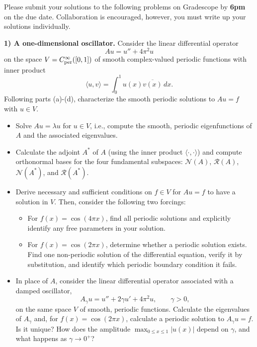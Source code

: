 \documentclass[12pt]{article}
\begin{document}
\noindent
Please submit your solutions to the following problems on Gradescope by \textbf{6pm} on the due date. Collaboration is encouraged, however, you must write up your solutions individually.

\bigskip

\noindent
\textbf{1) A one-dimensional oscillator.}
Consider the linear differential operator
\[
    Au=u''+4\pi^2u
\]
on the space $V=C_{\rm per}^\infty([0,1])$ of smooth complex-valued periodic functions with inner product
\[
    \langle u,v\rangle
    =\int_0^1 u(x)\overline{v(x)}\,dx.
\]
Following parts (a)-(d), characterize the smooth periodic solutions to $Au=f$ with $u\in V$.

\begin{itemize}
    \item[(a)] Solve $Au=\lambda u$ for $u\in V$, i.e., compute the smooth, periodic eigenfunctions of $A$ and the associated eigenvalues.

    \item[(b)] Calculate the adjoint $A^*$ of $A$ (using the inner product $\langle\cdot,\cdot\rangle$) and compute orthonormal bases for the four fundamental subspaces: $\mathcal{N}(A)$, $\mathcal{R}(A)$, $\mathcal{N}(A^*)$, and $\mathcal{R}(A^*)$.

    \item[(c)] Derive necessary and sufficient conditions on $f\in V$ for
    $Au=f$ to have a solution in $V$. Then, consider the following two forcings:
    \begin{itemize}
        \item[(i)] For $f(x)=\cos(4\pi x)$, find all periodic solutions
        and explicitly identify any free parameters in your solution.
        \item[(ii)] For $f(x)=\cos(2\pi x)$, determine whether a periodic
        solution exists. Find one non-periodic solution of the
        differential equation, verify it by substitution, and
        identify which periodic boundary condition it fails.
    \end{itemize}

    \item[(d)]
    In place of $A$, consider the linear differential operator associated with a damped oscillator,
    \[
        A_\gamma u=u''+2\gamma u'+4\pi^2u,
        \qquad \gamma>0,
    \]
    on the same space $V$ of smooth, periodic functions. Calculate the eigenvalues of $A_\gamma$ and, for $f(x)=\cos(2\pi x)$, calculate a periodic solution to $A_\gamma u = f$. Is it unique? How does the amplitude $\max_{0\leq x\leq 1}|u(x)|$ depend on $\gamma$, and what happens as $\gamma \to 0^+$?
\end{itemize}
\end{document}
